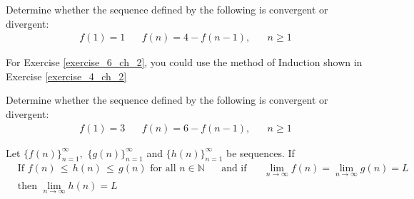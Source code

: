 \begin{exercise}\label{exercise_6_ch_2}
Determine whether the sequence defined by the following is convergent or divergent:
\begin{align*}
    f(1) = 1 \hspace{20pt} f(n) = 4 - f(n-1), \hspace{20pt} n \geq 1
\end{align*}
\end{exercise}

For Exercise \ref{exercise_6_ch_2}, you could use the method of Induction shown in Exercise \ref{exercise_4_ch_2}

\begin{exercise}
Determine whether the sequence defined by the following is convergent or divergent:
\begin{align*}
    f(1) = 3 \hspace{20pt} f(n) = 6 - f(n-1), \hspace{20pt} n \geq 1
\end{align*}
\end{exercise}



\begin{theorem}
Let $\{f(n)\}_{n=1}^{\infty}, \hspace{4pt} \{g(n)\}_{n=1}^{\infty}$ and $\{h(n)\}_{n=1}^{\infty}$ be sequences. If
\begin{align*}
    &\text{If} \hspace{4pt} f(n) \hspace{2pt} \leq \hspace{2pt} h(n) \hspace{2pt} \leq \hspace{2pt} g(n) \hspace{4pt} \text{for all} \hspace{4pt} n \in \mathbb{N} \hspace{20pt}
    \text{and if}  \hspace{20pt} \lim_{n \longrightarrow \infty} f(n) = \lim_{n \longrightarrow \infty} g(n) = L \\[2ex]
    &\text{then} \hspace{4pt} \lim_{n \longrightarrow \infty} h(n) = L 
\end{align*}
\label{squeeze_theorem}
\end{theorem}

